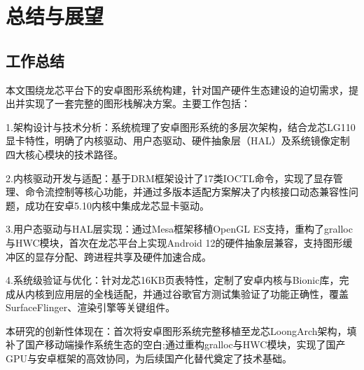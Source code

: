 
\chapter{总结与展望}

\section{工作总结}




本文围绕龙芯平台下的安卓图形系统构建，针对国产硬件生态建设的迫切需求，提出并实现了一套完整的图形栈解决方案。主要工作包括：

1.架构设计与技术分析：系统梳理了安卓图形系统的多层次架构，结合龙芯LG110显卡特性，明确了内核驱动、用户态驱动、硬件抽象层（HAL）及系统镜像定制四大核心模块的技术路径。

2.内核驱动开发与适配：基于DRM框架设计了17类IOCTL命令，实现了显存管理、命令流控制等核心功能，并通过多版本适配方案解决了内核接口动态兼容性问题，成功在安卓5.10内核中集成龙芯显卡驱动。

3.用户态驱动与HAL层实现：通过Mesa框架移植OpenGL ES支持，重构了gralloc与HWC模块，首次在龙芯平台上实现Android 12的硬件抽象层兼容，支持图形缓冲区的显存分配、跨进程共享及硬件加速合成。

4.系统级验证与优化：针对龙芯16KB页表特性，定制了安卓内核与Bionic库，完成从内核到应用层的全栈适配，并通过谷歌官方测试集验证了功能正确性，覆盖SurfaceFlinger、渲染引擎等关键组件。

本研究的创新性体现在：首次将安卓图形系统完整移植至龙芯LoongArch架构，填补了国产移动端操作系统生态的空白;通过重构gralloc与HWC模块，实现了国产GPU与安卓框架的高效协同，为后续国产化替代奠定了技术基础。

